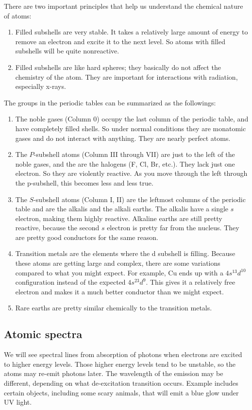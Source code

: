 \documentclass[11pt]{article}
\theoremstyle{break}
\theoremstyle{break}
\begin{document}
There are two important principles that help us understand the chemical nature of atoms:
\begin{enumerate}[topsep=3pt,itemsep=-1ex,partopsep=1ex,parsep=1ex]
\item  Filled subshells are very stable. It takes a relatively large amount of energy to remove an electron and excite it to the next level. So atoms with filled subshells will be quite nonreactive.
\item Filled subshells are like hard spheres; they basically do not affect the chemistry of the atom. They are important for interactions with radiation, especially x-rays.
\end{enumerate}
The groups in the periodic tables can be summarized as the followings:
\begin{enumerate}[topsep=3pt,itemsep=-1ex,partopsep=1ex,parsep=1ex]
\item The noble gases (Column 0) occupy the last column of the periodic table, and have completely
filled shells. So under normal conditions they are monatomic gases and do not interact
with anything. They are nearly perfect atoms. 
\item  The $P$-subshell atoms (Column III through VII) are just to the left of the noble gases, and the are the halogens (F, Cl, Br, etc.). They lack just one electron. So they are violently reactive. As you move through the left through the p-subshell, this becomes less and less true.
\item The $S$-subshell atoms (Column I, II) are the leftmost columns of the periodic table and are the alkalis and the alkali earths. The alkalis have a single $s$ electron, making them highly reactive. Alkaline earths are still pretty reactive, because the second $s$ electron is pretty far from the nucleus. They are pretty good conductors for the same reason.
\item Transition metals are the elements where the d subshell is filling. Because these atoms are getting large and complex, there are some variations compared to what you might expect. For example, Cu ends up with a $4s^13d^{10}$ configuration instead of the expected $4s^23d^9$. This gives it a relatively free electron and makes it a much better conductor than we might expect.
\item Rare earths are pretty similar chemically to the transition metals.
\end{enumerate}

\subsection{Atomic spectra}
We will see spectral lines from absorption of photons when electrons are excited to higher energy levels. Those higher energy levels tend to be unstable, so the atoms may re-emit photons later. The wavelength of the emission may be different, depending on what de-excitation transition occurs. Example includes certain objects, including some scary animals, that will emit a blue glow under UV light.\\
\end{document}
